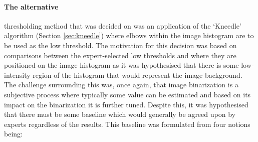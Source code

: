\paragraph{The alternative} thresholding method that was decided on was an application of the `Kneedle' algorithm (Section \ref{sec:kneedle}) where elbows within the image histogram are to be used as the low threshold. The motivation for this decision was based on comparisons between the expert-selected low thresholds and where they are positioned on the image histogram as it was hypothesised that there is some low-intensity region of the histogram that would represent the image background. The challenge surrounding this was, once again, that image binarization is a subjective process where typically some value can be estimated and based on its impact on the binarization it is further tuned. Despite this, it was hypothesised that there must be some baseline which would generally be agreed upon by experts regardless of the results. This baseline was formulated from four notions being:
